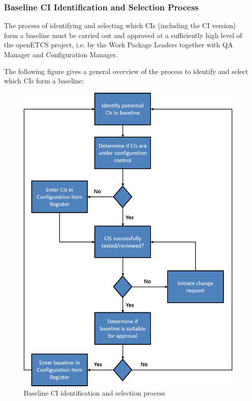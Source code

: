 \documentclass{template/openetcs_article}
\begin{document}
\subsubsection{Baseline CI Identification and Selection Process} %
\label{sec:Baseline CI Identification and Selection Process}

The process of identifying and selecting which CIs (including the CI version) form a baseline must be carried out and approved at a sufficiently high level of the openETCS project, i.e. by the Work Package Leaders together with QA Manager and Configuration Manager.

The following figure gives a general overview of the process to identify and select which CIs form a baseline:

\begin{figure}[H]
\centering
\caption{Baseline CI identification and selection process}
\includegraphics[scale=0.8]{./Figure/Baseline_Process.png}
\end{figure}
\end{document}
